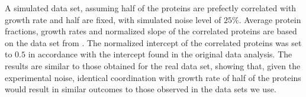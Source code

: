 \label{fig:simulated}
A simulated data set, assuming half of the proteins are prefectly correlated with growth rate and half are fixed, with simulated noise level of $25\%$.
Average protein fractions, growth rates and normalized slope of the correlated proteins are based on the data set from \cite{Heinemann2015}.
The normalized intercept of the correlated proteins was set to $0.5$ in accordance with the intercept found in the original data analysis.
The results are similar to those obtained for the real data set, showing that, given the experimental noise, identical coordination with growth rate of half of the proteins would result in similar outcomes to those observed in the data sets we use.